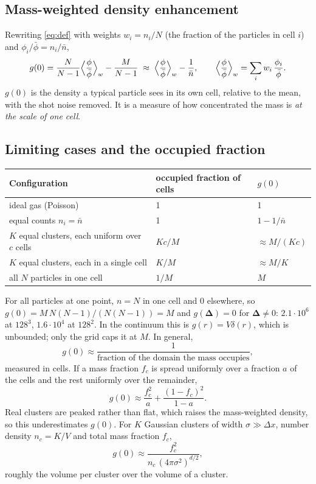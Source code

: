 \documentclass[11pt]{article}
\newcommand{\bD}{\boldsymbol{\Delta}}
\newcommand{\nb}{\bar n}
\begin{document}
\subsection{Mass-weighted density enhancement}
Rewriting \eqref{eq:def} with weights $w_i=n_i/N$ (the fraction of the
particles in cell $i$) and $\phi_i/\bar\phi=n_i/\nb$,
\begin{equation}
  g(0) = \frac{N}{N-1}\Bigl\langle\frac{\phi}{\bar\phi}\Bigr\rangle_{w}
         - \frac{M}{N-1}
  \;\approx\; \Bigl\langle\frac{\phi}{\bar\phi}\Bigr\rangle_{w} - \frac1{\nb},
  \qquad
  \Bigl\langle\frac{\phi}{\bar\phi}\Bigr\rangle_{w} = \sum_i w_i\,\frac{\phi_i}{\bar\phi}.
\end{equation}
$g(0)$ is the density a typical particle sees in its own cell, relative to the
mean, with the shot noise removed. It is a measure of how concentrated the
mass is \emph{at the scale of one cell}.

\subsection{Limiting cases and the occupied fraction}
\begin{center}
\begin{tabularx}{\textwidth}{@{}L l l@{}}
\toprule
Configuration & occupied fraction of cells & $g(0)$ \\
\midrule
ideal gas (Poisson) & 1 & 1 \\
equal counts $n_i=\nb$ & 1 & $1-1/\nb$ \\
$K$ equal clusters, each uniform over $c$ cells & $Kc/M$ & $\approx M/(Kc)$ \\
$K$ equal clusters, each in a single cell & $K/M$ & $\approx M/K$ \\
all $N$ particles in one cell & $1/M$ & $M$ \\
\bottomrule
\end{tabularx}
\end{center}
For all particles at one point, $n=N$ in one cell and 0 elsewhere, so
$g(0)=M\,N(N-1)/(N(N-1))=M$ and $g(\bD)=0$ for $\bD\ne0$: $2.1\cdot10^6$ at
$128^3$, $1.6\cdot10^4$ at $128^2$. In the continuum this is $g(r)=V\delta(r)$,
which is unbounded; only the grid caps it at $M$. In general,
\begin{equation}
  g(0)\approx\frac{1}{\text{fraction of the domain the mass occupies}} ,
\end{equation}
measured in cells. If a mass fraction $f_c$ is spread uniformly over a
fraction $a$ of the cells and the rest uniformly over the remainder,
\begin{equation}
  g(0)\approx \frac{f_c^2}{a}+\frac{(1-f_c)^2}{1-a} .
\end{equation}
Real clusters are peaked rather than flat, which raises the mass-weighted
density, so this underestimates $g(0)$. For $K$ Gaussian clusters of width
$\sigma\gg\Delta x$, number density $n_c=K/V$ and total mass fraction $f_c$,
\begin{equation}
  g(0)\approx\frac{f_c^2}{n_c\,(4\pi\sigma^2)^{d/2}} ,
\end{equation}
roughly the volume per cluster over the volume of a cluster.
\end{document}
